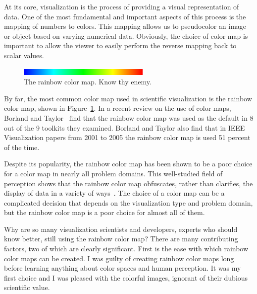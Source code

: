 \documentclass{acmsiggraph}               %
\newcommand{\lcite}[1]{~\cite{#1}}
\newcommand{\scite}[1]{~\shortcite{#1}}
\begin{document}

\copyrightspace

At its core, visualization is the process of providing a visual
representation of data.  One of the most fundamental and important aspects
of this process is the mapping of numbers to colors.  This mapping allows
us to pseudocolor an image or object based on varying numerical data.
Obviously, the choice of color map is important to allow the viewer to
easily perform the reverse mapping back to scalar values.

\begin{figure}
  \centering
  \includegraphics[width=2.5in]{images/RainbowBar}
  \caption{The rainbow color map.  Know thy enemy.}
  \label{fig:RainbowColorMap}
\end{figure}

By far, the most common color map used in scientific visualization is the
rainbow color map, shown in Figure~\ref{fig:RainbowColorMap}.  In a recent
review on the use of color maps, Borland and Taylor\scite{Borland07} find
that the rainbow color map was used as the default in 8 out of the 9
toolkits they examined.  Borland and Taylor also find that in IEEE
Visualization papers from 2001 to 2005 the rainbow color map is used 51
percent of the time.

Despite its popularity, the rainbow color map has been shown to be a poor
choice for a color map in nearly all problem domains.  This well-studied
field of perception shows that the rainbow color map obfuscates, rather
than clarifies, the display of data in a variety of ways\lcite{Boreland07}.
The choice of a color map can be a complicated decision that depends on the
visualization type and problem domain, but the rainbow color map is a poor
choice for almost all of them.

Why are so many visualization scientists and developers, experts who
should know better, still using the rainbow color map?
There are many contributing factors, two of which are clearly significant.
First is the ease with which rainbow color maps
can be created.  I was guilty of creating rainbow color maps
long before learning anything about color spaces and human perception.  It
was my first choice and I was pleased with the colorful images, ignorant of
their dubious scientific value.
\end{document}
